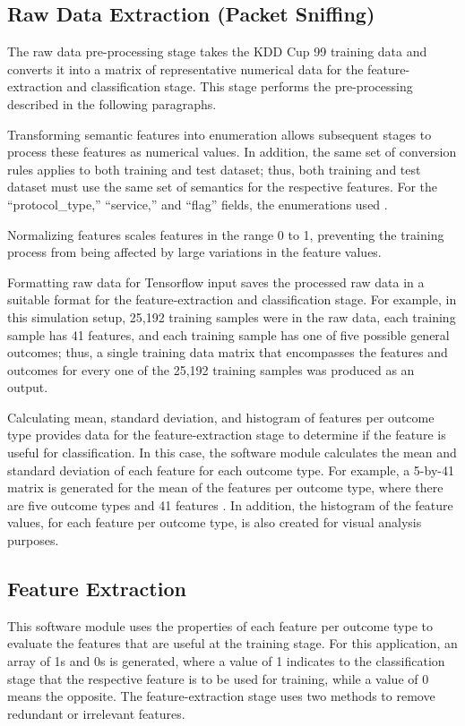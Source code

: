 \documentclass[12pt]{article}
\theoremstyle{definition}
\begin{document}
		\subsection{Raw Data Extraction (Packet Sniffing)}
		The raw data pre-processing stage takes the KDD Cup 99 training data and
		converts it into a matrix of representative numerical data for the feature-extraction and classification stage. This stage performs the pre-processing described in the following paragraphs.
		
		Transforming semantic features into enumeration allows subsequent stages to
		process these features as numerical values. In addition, the same set of conversion rules applies to both training and test dataset; thus, both training and test dataset must use the same set of semantics for the respective features. For the “protocol\_type,” “service,” and
		“flag” fields, the enumerations used \cite{Gautam2016}.
		
		Normalizing features scales features in the range 0 to 1, preventing the training process from being affected by large variations in the feature values.
		
		Formatting raw data for Tensorflow input saves the processed raw data in a
		suitable format for the feature-extraction and classification stage. For example, in this simulation setup, 25,192 training samples were in the raw data, each training sample has 41 features, and each training sample has one of five possible general outcomes; thus, a single training data matrix that encompasses the features and outcomes for every one of the 25,192 training samples was produced as an output.
		
		Calculating mean, standard deviation, and histogram of features per outcome type provides data for the feature-extraction stage to determine if the feature is useful for classification. In this case, the software module calculates the mean and standard deviation of each feature for each outcome type. For example, a 5-by-41 matrix is generated for the mean of the features per outcome type, where there are five outcome types and 41 features \cite{Gautam2016}. In addition, the histogram of the feature values, for each feature per outcome type, is also created for visual analysis purposes.
		
		
		
		\subsection{Feature Extraction}
		This software module uses the properties of each feature per outcome type to evaluate the features that are useful at the training stage. For this application, an array of 1s and 0s is generated, where a value of 1 indicates to the classification stage that the respective feature is to be used for training, while a value of 0 means the opposite.
		The feature-extraction stage uses two methods to remove redundant or irrelevant features.
\end{document}
